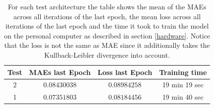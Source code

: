 \begin{center}
    \begin{table}[H]
        \centering
        \begin{tabular}{ | c | c | c | c | }
            \hline
            Test &MAEs last Epoch & Loss last Epoch & Training time\\ \hline
            2 & $0.08430038$  & $0.08984258$  & 19 min 19 sec  \\  
            1 & $0.07351803$  & $0.08184456$  & 19 min 40 sec  \\  
            \hline
        \end{tabular} 
        \caption{For each test architecture the table shows the mean of the MAEs across all iterations of the last
        epoch, the mean loss across all iterations of the last epoch and the time it took to train the model
        on the personal computer as described in section \ref{hardware}. Notice that the loss is not the same
        as MAE since it additionally takes the Kullback-Leibler divergence into account.}
    \end{table} \label{table_maes3}
\end{center}

